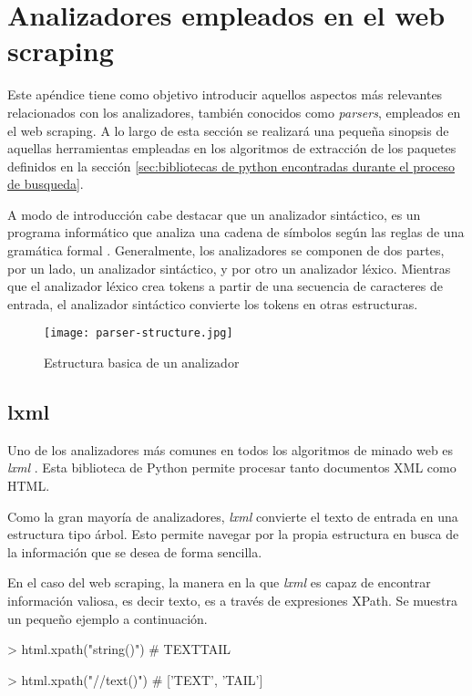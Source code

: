 \chapter{Analizadores empleados en el web scraping}
\label{cha:analizadores empleados en el web scraping}

Este apéndice tiene como objetivo introducir aquellos aspectos más relevantes relacionados con los
analizadores, también conocidos como \emph{parsers}, empleados en el web scraping. A lo largo de esta sección
se realizará una pequeña sinopsis de aquellas herramientas empleadas en los algoritmos de extracción de
los paquetes definidos en la sección \ref{sec:bibliotecas de python encontradas durante el proceso de 
busqueda}.

A modo de introducción cabe destacar que un analizador sintáctico, es un programa informático que analiza
una cadena de símbolos según las reglas de una gramática formal \cite{parser-lexer}. Generalmente, los 
analizadores se componen de dos partes, por un lado, un analizador sintáctico, y por otro un analizador 
léxico. Mientras que el analizador léxico crea tokens a partir de una secuencia de caracteres de entrada, 
el analizador sintáctico convierte los tokens en otras estructuras.

\begin{figure}[tphb]
    \centering
    \texttt{[image: parser-structure.jpg]}
    \caption{Estructura basica de un analizador}
    \label{img:estructura basica de un analizador}
\end{figure}

\section{lxml}
\label{sec:lxml}

Uno de los analizadores más comunes en todos los algoritmos de minado web es \emph{lxml} \cite{lxml}. Esta
biblioteca de Python permite procesar tanto documentos XML como HTML.

Como la gran mayoría de analizadores, \emph{lxml} convierte el texto de entrada en una estructura tipo 
árbol. Esto permite navegar por la propia estructura en busca de la información que se desea de forma 
sencilla. 

En el caso del web scraping, la manera en la que \emph{lxml} es capaz de encontrar información valiosa, es 
decir texto, es a través de expresiones XPath. Se muestra un pequeño ejemplo a continuación.

\begin{Schunk}
    \begin{Soutput}
        > html.xpath("string()")
        # TEXTTAIL

        > html.xpath("//text()")
        # ['TEXT', 'TAIL']
    \end{Soutput}
\end{Schunk}

